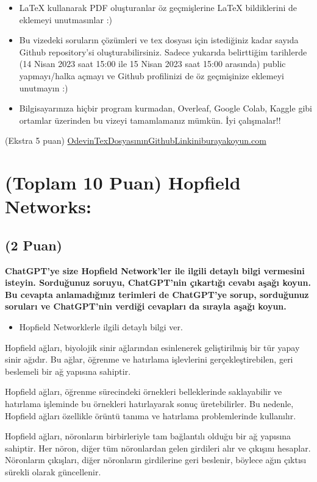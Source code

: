 \documentclass[11pt]{article}
\begin{document}
\begin{itemize}
    \item LaTeX kullanarak PDF oluşturanlar öz geçmişlerine LaTeX bildiklerini de eklemeyi unutmasınlar :)
    \item Bu vizedeki soruların çözümleri ve tex dosyası için istediğiniz kadar sayıda Github repository'si oluşturabilirsiniz. Sadece yukarıda belirttiğim tarihlerde (14 Nisan 2023 saat 15:00 ile 15 Nisan 2023 saat 15:00 arasında) public yapmayı/halka açmayı ve Github profilinizi de öz geçmişinize eklemeyi unutmayın :)
    \item Bilgisayarınıza hiçbir program kurmadan, Overleaf, Google Colab, Kaggle gibi ortamlar üzerinden bu vizeyi tamamlamanız mümkün. İyi çalışmalar!!
\end{itemize}

(Ekstra 5 puan) \url{OdevinTexDosyasınınGithubLinkiniburayakoyun.com}

\newpage
\section{(Toplam 10 Puan) Hopfield Networks:}

\subsection{(2 Puan)} \textbf{ChatGPT’ye size Hopfield Network’ler ile ilgili detaylı bilgi vermesini isteyin. Sorduğunuz soruyu, ChatGPT'nin çıkartığı cevabı aşağı koyun. Bu cevapta anlamadığınız terimleri de ChatGPT’ye sorup, sorduğunuz soruları ve ChatGPT’nin verdiği cevapları da sırayla aşağı koyun.}


\begin{itemize}
    \item Hopfield Networklerle ilgili detaylı bilgi ver.\\
\end{itemize}
Hopfield ağları, biyolojik sinir ağlarından esinlenerek geliştirilmiş bir tür yapay sinir ağıdır. Bu ağlar, öğrenme ve hatırlama işlevlerini gerçekleştirebilen, geri beslemeli bir ağ yapısına sahiptir.

Hopfield ağları, öğrenme sürecindeki örnekleri belleklerinde saklayabilir ve hatırlama işleminde bu örnekleri hatırlayarak sonuç üretebilirler. Bu nedenle, Hopfield ağları özellikle örüntü tanıma ve hatırlama problemlerinde kullanılır.

Hopfield ağları, nöronların birbirleriyle tam bağlantılı olduğu bir ağ yapısına sahiptir. Her nöron, diğer tüm nöronlardan gelen girdileri alır ve çıkışını hesaplar. Nöronların çıkışları, diğer nöronların girdilerine geri beslenir, böylece ağın çıktısı sürekli olarak güncellenir.
\end{document}
